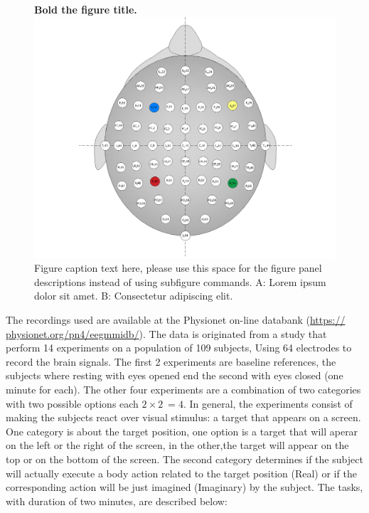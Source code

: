 \documentclass[10pt,letterpaper]{article}
\begin{document}
\begin{figure}[!h]
  \caption{{\bf Bold the figure title.}
  \includegraphics[width=.9\textwidth]{../fig_cabeca/FIG_CABECA.png}
  Figure caption text here, please use this space for the figure panel descriptions instead of using subfigure commands. A: Lorem ipsum dolor sit amet. B: Consectetur adipiscing elit.}
  \label{fig:cabeca}
  \end{figure}


The recordings used are available at the Physionet on-line databank (\url{https:// physionet.org/pn4/eegmmidb/}). The data is originated from a study that perform 14 experiments on a population of 109 subjects, Using 64 electrodes to record the brain signals. The first 2 experiments are baseline references, the subjects where resting with eyes opened end the second with eyes closed (one minute for each). The other four experiments are a combination of two categories with two possible options each \(2 \times 2\ = 4\). In general, the experiments consist of making the subjects react over visual stimulus: a target that appears on a screen. One category is about the target position, one option is a target that will aperar on the left or the right of the screen, in the other,the target will appear on the top or on the bottom of the screen. The second category determines if the subject will actually execute a body action related to the target position (Real) or if the corresponding action will be just imagined (Imaginary) by the subject. The tasks, with duration of two minutes, are described below:
\end{document}
